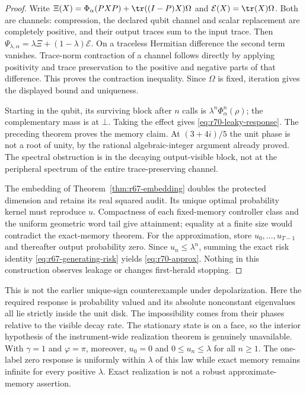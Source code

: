 \begin{proof}
Write $\Xi(X)=\Phi_\alpha(PXP)+\tr((I-P)X)\Omega$ and
$\mathcal E(X)=\tr(X)\Omega$. Both are channels: compression, the declared qubit channel and scalar replacement are completely positive, and their output traces sum to the input trace. Then $\Psi_{\lambda,\alpha}=\lambda\Xi+(1-\lambda)\mathcal E$. On a traceless Hermitian difference the second term vanishes. Trace-norm contraction of a channel follows directly by applying positivity and trace preservation to the positive and negative parts of that difference. This proves the contraction inequality. Since $\Omega$ is fixed, iteration gives the displayed bound and uniqueness.

Starting in the qubit, its surviving block after $n$ calls is $\lambda^n\Phi_\alpha^n(\rho)$; the complementary mass is at $\bot$. Taking the effect gives \eqref{eq:r70-leaky-response}. The preceding theorem proves the memory claim. At $(3+4i)/5$ the unit phase is not a root of unity, by the rational algebraic-integer argument already proved. The spectral obstruction is in the decaying output-visible block, not at the peripheral spectrum of the entire trace-preserving channel.

The embedding of Theorem~\ref{thm:r67-embedding} doubles the protected dimension and retains its real squared audit. Its unique optimal probability kernel must reproduce $u$. Compactness of each fixed-memory controller class and the uniform geometric word tail give attainment; equality at a finite size would contradict the exact-memory theorem. For the approximation, store $u_0,\ldots,u_{T-1}$ and thereafter output probability zero. Since $u_n\le\lambda^n$, summing the exact risk identity \eqref{eq:r67-generating-risk} yields \eqref{eq:r70-approx}. Nothing in this construction observes leakage or changes first-herald stopping.
\end{proof}

This is not the earlier unique-sign counterexample under depolarization. Here the required response is probability valued and its absolute nonconstant eigenvalues all lie strictly inside the unit disk. The impossibility comes from their phases relative to the visible decay rate. The stationary state is on a face, so the interior hypothesis of the instrument-wide realization theorem is genuinely unavailable. With $\gamma=1$ and $\varphi=\pi$, moreover, $u_0=0$ and $0\le u_n\le\lambda$ for all $n\ge1$. The one-label zero response is uniformly within $\lambda$ of this law while exact memory remains infinite for every positive $\lambda$. Exact realization is not a robust approximate-memory assertion.

